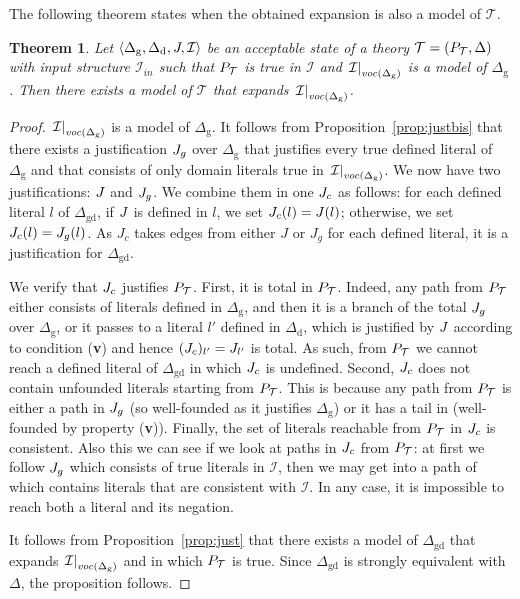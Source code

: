 \documentclass[11pt]{article}
\newcommand{\m}[1]{\ensuremath{#1}\xspace}
\newcommand{\I}{\m{\mathcal{I}}}
\newcommand{\Iin}{\m{\I_{in}}}
\newcommand{\theory}{\m{\mathcal{T}}}
\newcommand{\D}{\m{\Delta}}
\newcommand{\tuple}[1]{\m{\left \langle #1 \right \rangle }}
\theoremstyle{plain}
\newtheorem{theorem}[thm]{Theorem}
\theoremstyle{definition}
\theoremstyle{example_basic}
\theoremstyle{example_contd}
\theoremstyle{plain}
\newcommand{\Dg}{\ensuremath{\D_\text{g}}\xspace}
\newcommand{\Dd}{\ensuremath{\D_\text{d}}\xspace}
\newcommand{\Dgd}{\ensuremath{\D_\text{gd}}\xspace}
\newcommand{\pt}{\ensuremath{P_\text{\theory}}\xspace}
\newcommand{\tbf}[1]{\textbf{#1}}
\newcommand{\change}[1]{#1}
\begin{document}
The following theorem states when the obtained expansion is also a model of \theory.

\begin{theorem}\label{theo:acceptablemodel}
Let $\tuple{\Dg,\Dd,\jgraph,\I}$ be an acceptable state of a theory
$\theory = (\pt,\D)$ with input structure \Iin such that \pt is
true in \I and $\restr{\I}{\vocf{\Dg}}$ is a model of \Dg.
Then there exists a model \M of \theory that expands $\restr{\I}{\vocf{\Dg}}$.
\end{theorem}
\begin{proof}
$\restr{\I}{\vocf{\Dg}}$ is a model of $\Dg$. It follows from
Proposition~\ref{prop:justbis}  that there exists a justification
$J_g$ over $\Dg$ that justifies  every true defined literal of $\Dg$
and that consists of only domain literals true in
$\restr{\I}{\vocf{\Dg}}$. We now have two justifications: $J$ and
$J_g$. We combine them in one $J_c$ as follows: for each defined
literal $l$ of $\Dgd$, if $J$ is defined in $l$, we set
$J_c(l)=J(l)$; otherwise, we set  $J_c(l)=J_g(l)$. 
\change{As $J_c$ takes edges from either $J$ or $J_g$ for each defined literal, it is a justification for \Dgd.}

We verify that $J_c$ justifies \pt. First, it is total in \pt. Indeed, any path from \pt either consists of literals defined in \Dg, and then it is a branch of the total $J_g$ over \Dg, or it passes to a literal $l'$ defined in \Dd, which is justified by $J$ according to condition (\tbf{v}) and hence $(J_c)_{l'} = J_{l'}$ is total. As such, from \pt we cannot reach a defined literal of \Dgd in which $J_c$ is undefined. \change{Second, $J_c$ does not contain unfounded literals starting from \pt. This is because any path from \pt is either a path in $J_g$ (so well-founded as it justifies \Dg) or it has a tail in \jgraph (well-founded by property (\tbf{v}))}. Finally, the set of literals reachable from \pt in $J_c$ is consistent. Also this we can see if we look at paths in $J_c$ from \pt: at first we follow $J_g$ which consists of true literals in $\I$, then we may get into a path of \jgraph which contains literals that are consistent with $\I$. In any case, it is impossible to reach both a literal and its negation. 

It follows from Proposition~\ref{prop:just} that there exists a model of \Dgd that expands  $\restr{\I}{\vocf{\Dg}}$ and in which \pt is true. Since \Dgd is strongly equivalent with \D, the proposition follows.
\end{proof}
\end{document}
